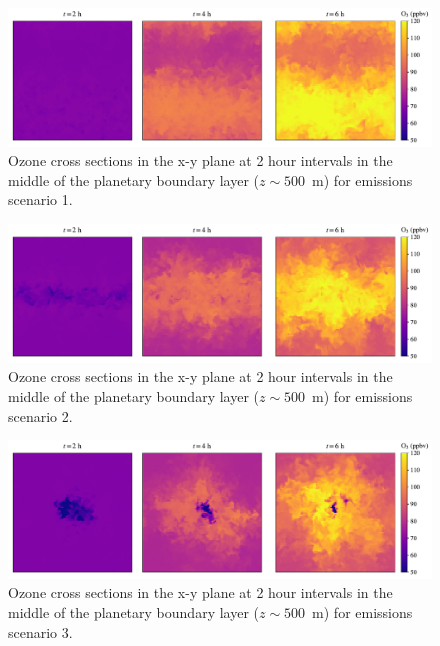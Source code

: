 \begin{figure}[!t]
    \centering
    \includegraphics[width=.9\textwidth]{figures/chapter4/o3-crosssec-fx1fy0-z25.pdf}
    \caption{Ozone cross sections in the x-y plane at 2 hour intervals in the middle of the planetary boundary layer ($z\sim500$~\si{m}) for emissions scenario 1.}
    \label{fig:o3-crosssec-s1}
\end{figure}

\begin{figure}[!t]
    \centering
    \includegraphics[width=.9\textwidth]{figures/chapter4/o3-crosssec-road-10x-z25.pdf}
    \caption{Ozone cross sections in the x-y plane at 2 hour intervals in the middle of the planetary boundary layer ($z\sim500$~\si{m}) for emissions scenario 2.}
    \label{fig:o3-crosssec-s2}
\end{figure}

  \begin{figure}[!t]
    \centering
    \includegraphics[width=.9\textwidth]{figures/chapter4/o3-crosssec-point-source-1x1-z25.pdf}
    \caption{Ozone cross sections in the x-y plane at 2 hour intervals in the middle of the planetary boundary layer ($z\sim500$~\si{m}) for emissions scenario 3.}
    \label{fig:o3-crosssec-s3}
\end{figure}

